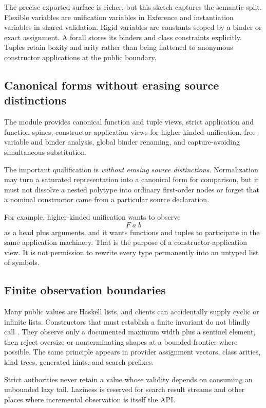 \documentclass[10pt,letterpaper,oneside]{report}
\newcommand{\code}[1]{\texttt{\detokenize{#1}}}
\begin{document}
The precise exported surface is richer, but this sketch captures the semantic split. Flexible variables are unification variables in Exference and instantiation variables in shared validation. Rigid variables are constants scoped by a binder or exact assignment. A forall stores its binders and class constraints explicitly. Tuples retain boxity and arity rather than being flattened to anonymous constructor applications at the public boundary.

\subsection{Canonical forms without erasing source distinctions}

The module provides canonical function and tuple views, strict application and function spines, constructor-application views for higher-kinded unification, free-variable and binder analysis, global binder renaming, and capture-avoiding simultaneous substitution.

The important qualification is \emph{without erasing source distinctions}. Normalization may turn a saturated representation into a canonical form for comparison, but it must not dissolve a nested polytype into ordinary first-order nodes or forget that a nominal constructor came from a particular source declaration.

For example, higher-kinded unification wants to observe
\[
  F\;a\;b
\]
as a head plus arguments, and it wants functions and tuples to participate in the same application machinery. That is the purpose of a constructor-application view. It is not permission to rewrite every type permanently into an untyped list of symbols.

\subsection{Finite observation boundaries}

Many public values are Haskell lists, and clients can accidentally supply cyclic or infinite lists. Constructors that must establish a finite invariant do not blindly call \code{length}. They observe only a documented maximum width plus a sentinel element, then reject oversize or nonterminating shapes at a bounded frontier where possible. The same principle appears in provider assignment vectors, class arities, kind trees, generated hints, and search prefixes.

\begin{invariantbox}
Strict authorities never retain a value whose validity depends on consuming an unbounded lazy tail. Laziness is reserved for search result streams and other places where incremental observation is itself the API.
\end{invariantbox}
\end{document}
